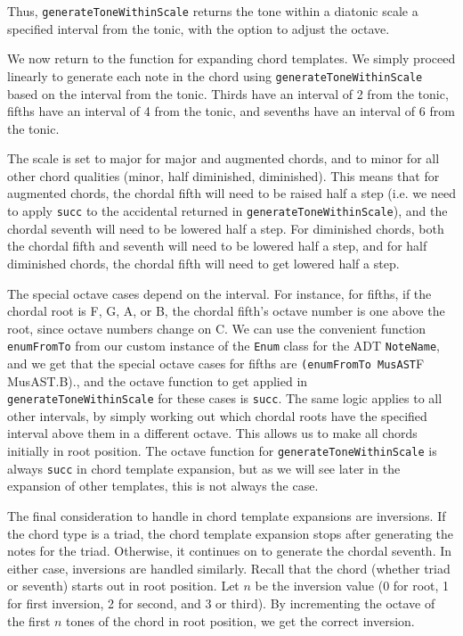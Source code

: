 \documentclass{report}
\begin{document}
Thus, \verb.generateToneWithinScale. returns the tone within a diatonic scale a specified interval from the tonic, with the option to adjust the octave.

We now return to the function for expanding chord templates. We simply proceed linearly to generate each note in  the chord using \verb.generateToneWithinScale. based on the interval from the tonic. Thirds have an interval of 2 from the tonic, fifths have an interval of 4 from the tonic, and sevenths have an interval of 6 from the tonic.

The scale is set to major for major and augmented chords, and to minor for all other chord qualities (minor, half diminished, diminished). This means that for augmented chords, the chordal fifth will need to be raised half a step (i.e. we need to apply \verb.succ. to the accidental returned in \verb.generateToneWithinScale.), and the chordal seventh will need to be lowered half a step. For diminished chords, both the chordal fifth and seventh will need to be lowered half a step, and for half diminished chords, the chordal fifth will need to get lowered half a step. 

The special octave cases depend on the interval. For instance, for fifths, if the chordal root is F, G, A, or B, the chordal fifth's octave number is one above the root, since octave numbers change on C. We can use the convenient function \verb.enumFromTo. from our custom instance of the \verb.Enum. class for the ADT \verb.NoteName., and we get that the special octave cases for fifths are \verb.(enumFromTo MusAST.F MusAST.B)., and the octave function to get applied in \verb.generateToneWithinScale. for these cases is \verb.succ.. The same logic applies to all other intervals, by simply working out which chordal roots have the specified interval above them in a different octave. This allows us to make all chords initially in root position. The octave function for \verb.generateToneWithinScale. is always \verb.succ. in chord template expansion, but as we will see later in the expansion of other templates, this is not always the case. 

The final consideration to handle in chord template expansions are inversions. If the chord type is a triad, the chord template expansion stops after generating the notes for the triad. Otherwise, it continues on to generate the chordal seventh. In either case, inversions are handled similarly. Recall that the chord (whether triad or seventh) starts out in root position. Let $n$ be the inversion value (0 for root, 1 for first inversion, 2 for second,  and 3 or third). By incrementing the octave of the first $n$ tones of the chord in root position, we get the correct inversion. 
\end{document}
